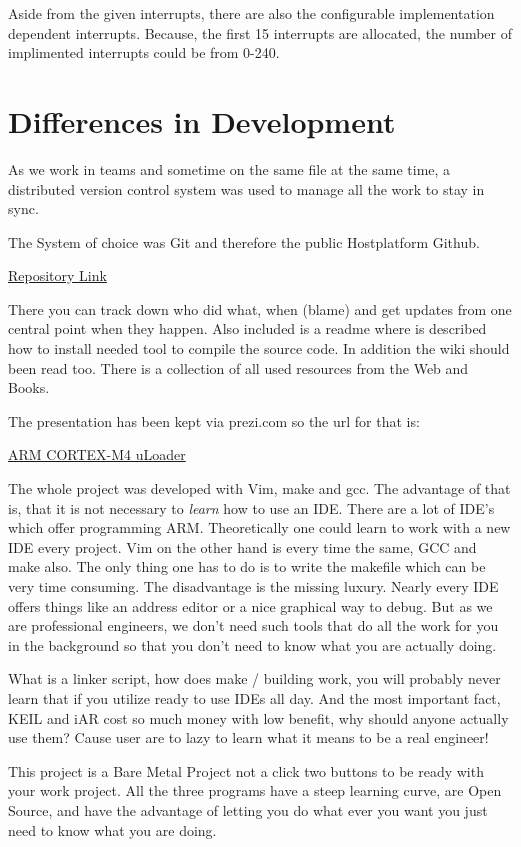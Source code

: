 Aside from the given interrupts, there are also the configurable implementation dependent interrupts.
Because, the first 15 interrupts are allocated, the number of implimented interrupts could be from 0-240.

\section{Differences in Development}
As we work in teams and sometime on the same file at the same time,
a distributed version control system was used to manage all the work to stay in sync.

The System of choice was Git and therefore the public Hostplatform Github.

\href{https://github.com/Voigt-Alexander/arm-uLoader}{Repository Link}

There you can track down who did what, when (blame) and get updates from one central point when they happen.
Also included is a readme where is described how to install needed tool to compile the source code.
In addition the wiki should been read too.
There is a collection of all used resources from the Web and Books.

The presentation has been kept via prezi.com so the url for that is:

\href{https://prezi.com/ighh7uigrhic/arm-cortex-m4-uloader/}{ARM CORTEX-M4 uLoader}

The whole project was developed with Vim, make and gcc.
The advantage of that is, that it is not necessary to \textit{learn} how to use an IDE.
There are a lot of IDE's which offer programming ARM. Theoretically one could
learn to work with a new IDE every project. Vim on the other hand is every time
the same, GCC and make also. The only thing one has to do is to write the
makefile which can be very time consuming.
The disadvantage is the missing luxury. Nearly every IDE offers things like an
address editor or a nice graphical way to debug.
But as we are professional engineers, we don't need such tools that do all the work for you in the background
so that you don't need to know what you are actually doing.

What is a linker script, how does make / building work,
you will probably never learn that if you utilize ready to use IDEs all day.
And the most important fact, KEIL and iAR cost so much money with low benefit, why should anyone actually use them?
Cause user are to lazy to learn what it means to be a real engineer!

This project is a Bare Metal Project not a click two buttons to be ready with your work project.
All the three programs have a steep learning curve, are Open Source,
and have the advantage of letting you do what ever you want you just need to know what you are doing.

